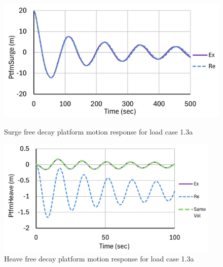 \documentclass[a4paper, 11pt]{article}
\begin{document}
\begin{figure}[H]
    \begin{minipage}{0.47\textwidth}
        \centering
        \includegraphics[width=1\textwidth]{1.3_surge_mine.png}
        \caption{\small Surge free decay platform motion response for load case 1.3a}
        \label{fig:1.3a_surge_mine_recreated}
    \end{minipage}
    \hfill
    \begin{minipage}{0.49\textwidth}
        \centering
        \includegraphics[width=0.95\textwidth]{1.3a_heave_mine_1.png}
        \caption{\small Heave free decay platform motion response for load case 1.3a}
        \label{fig:1.3a_heave_mine_recreated}
    \end{minipage}
\end{figure}
\end{document}
